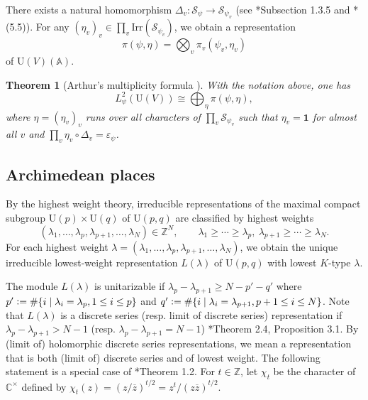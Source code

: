 \documentclass[11pt]{amsart}
\theoremstyle{plain}
\newtheorem{thm}{Theorem}[section]
\theoremstyle{definition}
\numberwithin{equation}{section}
\def\U{\mathrm{U}}
\newcommand{\bbA}{\mathbb{A}}
\newcommand{\bbC}{\mathbb{C}}
\newcommand{\bbZ}{\mathbb{Z}}
\newcommand{\calS}{\mathcal{S}}
\newcommand{\vep}{\varepsilon}
\newcommand{\Irr}{\mathrm{Irr}}
\newcommand{\defeq}{\vcentcolon=}
\begin{document}
There exists a natural homomorphism $\Delta_v \colon \calS_{\psi} \rightarrow \calS_{\psi_v}$ (see \cite{KMSW}*{Subsection 1.3.5} and \cite{2025_HMY_Kodaira_dimension_ball_quotients}*{(5.5)}).
For any $(\eta_v)_v \in \prod_v\Irr(\calS_{\psi_v})$, we obtain a representation
\[
\pi(\psi,\eta) = \bigotimes_v \pi_v(\psi_v, \eta_v)
\]
of $\U(V)(\bbA)$.
\begin{thm}[Arthur's multiplicity formula {\cites{Mok_2015,KMSW}}]\label{AMF}
With the notation above, one has
\[
L^2_\psi(\U(V)) \cong \bigoplus_\eta \pi(\psi,\eta),
\]
where $\eta = (\eta_v)_v$ runs over all characters of $\prod_v\calS_{\psi_v}$ such that $\eta_v = \mathbf{1}$ for almost all $v$ and $\prod_v \eta_v \circ \Delta_v = \vep_\psi$.
\end{thm}
\subsection{Archimedean places}


By the highest weight theory, 
irreducible representations of the maximal compact subgroup $\U(p) \times \U(q)$ of $\U(p,q)$ are classified by highest weights
\[
(\lambda_1,\ldots,\lambda_p,\lambda_{p+1},\ldots,\lambda_{N}) \in \bbZ^{N}, \qquad \lambda_1 \geq \cdots \geq \lambda_p,\ \lambda_{p+1} \geq \cdots \geq \lambda_{N}.
\]
For each highest weight $\lambda = (\lambda_1,\ldots,\lambda_p,\lambda_{p+1},\ldots,\lambda_{N})$, we obtain the unique irreducible lowest-weight representation $L(\lambda)$ of $\U(p,q)$ with lowest $K$-type $\lambda$.

The module $L(\lambda)$ is unitarizable if $\lambda_p - \lambda_{p+1} \geq N -p' - q'$ where $p' \defeq \#\{i \mid \lambda_i = \lambda_p, 1 \leq i \leq p\}$ and $q' \defeq \#\{i \mid \lambda_i = \lambda_{p+1}, p+1 \leq i \leq N\}$.
Note that $L(\lambda)$ is a discrete series (resp. limit of discrete series) representation if $\lambda_{p} - \lambda_{p+1} > N-1$ (resp. $\lambda_p - \lambda_{p+1} = N-1$) \cite{EHW_83}*{Theorem 2.4, Proposition 3.1}.
By (limit of) holomorphic discrete series representations, we mean a representation that is both (limit of) discrete series and of lowest weight.
The following statement is a special case of \cite{Horinaga_LW_unitary}*{Theorem 1.2}.
For $t \in \bbZ$, let $\chi_t$ be the character of $\bbC^\times$ defined by $\chi_t(z) = (z/\overline{z})^{t/2} = z^t/(z\overline{z})^{t/2}$.
\end{document}
